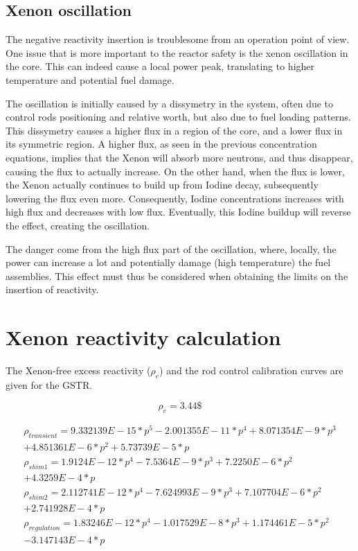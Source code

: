 \subsection{Xenon oscillation}

The negative reactivity insertion is troublesome from an operation point of view. One issue that is more important to the reactor safety is the xenon oscillation in the core. This can indeed cause a local power peak, translating to higher temperature and potential fuel damage.

The oscillation is initially caused by a dissymetry in the system, often due to control rods positioning and relative worth, but also due to fuel loading patterns. This dissymetry causes a higher flux in a region of the core, and a lower flux in its symmetric region. A higher flux, as seen in the previous concentration equations, implies that the Xenon will absorb more neutrons, and thus disappear, causing the flux to actually increase. On the other hand, when the flux is lower, the Xenon actually continues to build up from Iodine decay, subsequently lowering the flux even more. Consequently, Iodine concentrations increases with high flux and decreases with low flux. Eventually, this Iodine buildup will reverse the effect, creating the oscillation.

The danger come from the high flux part of the oscillation, where, locally, the power can increase a lot and potentially damage (high temperature) the fuel assemblies. This effect must thus be considered when obtaining the limits on the insertion of reactivity.

\section{Xenon reactivity calculation}

The Xenon-free excess reactivity ($\rho_e$) and the rod control calibration curves are given for the GSTR.

\begin{equation}
\rho_e = 3.44\$
\end{equation}


\begin{equation}
\begin{aligned}
\rho_{transient} = 9.332139E-15 * p^5 - 2.001355E-11 * p^4 + 8.071354E-9*p^3\\
 + 4.851361E-6*p^2 + 5.73739E-5*p\\
\rho_{shim1} = 1.9124E-12 * p^4 - 7.5364E-9 * p^3 + 7.2250E-6 * p^2\\
 + 4.3259E-4 * p\\
\rho_{shim2} = 2.112741E-12*p^4 - 7.624993E-9*p^3 + 7.107704E-6*p^2\\
 + 2.741928E-4*p\\
\rho_{regulation} = 1.83246E-12*p^4 - 1.017529E-8*p^3 + 1.174461E-5*p^2\\
 - 3.147143E-4*p
\end{aligned}
\end{equation}

